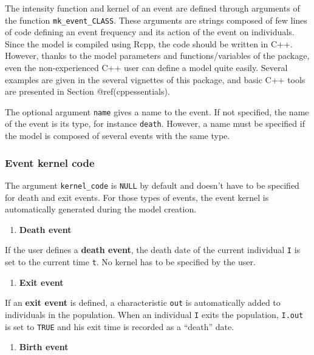 The intensity function and kernel of an event are defined through arguments of the function \texttt{mk\_event\_CLASS}. These arguments are strings composed of few lines of code defining an event frequency and its action of the event on individuals. Since the model is compiled using Rcpp, the code should be written in C++. However, thanks to the model parameters and functions/variables of the package, even the non-experienced C++ user can define a model quite easily. Several examples are given in the several vignettes of this package, and basic C++ tools are presented in Section @ref(cppessentials).

The optional argument \texttt{name} gives a name to the event. If not specified, the name of the event is its type, for instance \texttt{death}. However, a name must be specified if the model is composed of several events with the same type.

\hypertarget{event-kernel-code}{%
\subsubsection{Event kernel code}\label{event-kernel-code}}

The argument \texttt{kernel\_code} is \texttt{NULL} by default and doesn't have to be specified for death and exit events. For those types of events, the event kernel is automatically generated during the model creation.

\begin{enumerate}
\def\labelenumi{\arabic{enumi}.}
\tightlist
\item
  \textbf{Death event}
\end{enumerate}

If the user defines a \textbf{death event}, the death date of the current individual \texttt{I} is set to the current time \texttt{t}. No kernel has to be specified by the user.

\begin{enumerate}
\def\labelenumi{\arabic{enumi}.}
\setcounter{enumi}{1}
\tightlist
\item
  \textbf{Exit event}
\end{enumerate}

If an \textbf{exit event} is defined, a characteristic \texttt{out} is automatically added to individuals in the population. When an individual \texttt{I} exits the population, \texttt{I.out} is set to \texttt{TRUE} and his exit time is recorded as a ``death'' date.

\begin{enumerate}
\def\labelenumi{\arabic{enumi}.}
\setcounter{enumi}{2}
\tightlist
\item
  \textbf{Birth event}
\end{enumerate}

